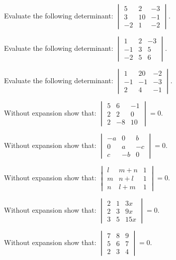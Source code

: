 \documentclass[11pt,a4paper]{article}
\begin{document}
\begin{shortlist}
\item Evaluate the following determinant: $\begin{vmatrix}5 & 2 & -3\\ 3 & 10 & -1\\ -2 & 1 & -2\end{vmatrix}$.

\item Evaluate the following determinant: $\begin{vmatrix}1 & 2 & -3\\ -1 & 3 & 5\\ -2 & 5 & 6\end{vmatrix}$.

\item Evaluate the following determinant: $\begin{vmatrix}1 & 20 & -2\\ -1 & -1 & -3\\ 2 & 4 & -1\end{vmatrix}$.

\item Without expansion show that: $\begin{vmatrix}5 & 6 & -1\\ 2 & 2 & 0\\ 2 & -8 & 10\end{vmatrix}=0$.

\item Without expansion show that: $\begin{vmatrix}-a & 0 & b\\ 0 & a & -c\\ c & -b & 0\end{vmatrix}=0$.

\item Without expansion show that: $\begin{vmatrix}l & m+n & 1\\ m & n+l & 1\\ n & l+m & 1\end{vmatrix}=0$.

\item Without expansion show that: $\begin{vmatrix}2 & 1 & 3x\\ 2 & 3 & 9x\\ 3 & 5 & 15x\end{vmatrix}=0$.

\item Without expansion show that: $\begin{vmatrix}7 & 8 & 9\\ 5 & 6 & 7\\ 2 & 3 & 4\end{vmatrix}=0$.


\end{shortlist}
\end{document}
